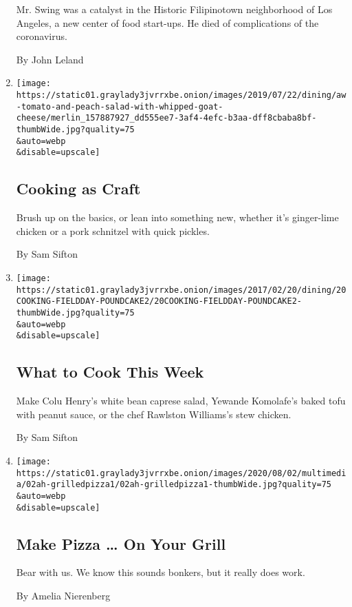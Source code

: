 \begin{enumerate}
  Mr. Swing was a catalyst in the Historic Filipinotown neighborhood of
  Los Angeles, a new center of food start-ups. He died of complications
  of the coronavirus.

  By John Leland
\item
  \href{/2020/08/03/dining/cooking-as-craft.html}{}

  \texttt{[image: https://static01.graylady3jvrrxbe.onion/images/2019/07/22/dining/aw-tomato-and-peach-salad-with-whipped-goat-cheese/merlin\_157887927\_dd555ee7-3af4-4efc-b3aa-dff8cbaba8bf-thumbWide.jpg?quality=75\\\&auto=webp\\\&disable=upscale]}

  \hypertarget{cooking-as-craft}{%
  \subsection{Cooking as Craft}\label{cooking-as-craft}}

  Brush up on the basics, or lean into something new, whether it's
  ginger-lime chicken or a pork schnitzel with quick pickles.

  By Sam Sifton
\item
  \href{/2020/08/02/dining/what-to-cook-this-week.html}{}

  \texttt{[image: https://static01.graylady3jvrrxbe.onion/images/2017/02/20/dining/20COOKING-FIELDDAY-POUNDCAKE2/20COOKING-FIELDDAY-POUNDCAKE2-thumbWide.jpg?quality=75\\\&auto=webp\\\&disable=upscale]}

  \hypertarget{what-to-cook-this-week}{%
  \subsection{What to Cook This Week}\label{what-to-cook-this-week}}

  Make Colu Henry's white bean caprese salad, Yewande Komolafe's baked
  tofu with peanut sauce, or the chef Rawlston Williams's stew chicken.

  By Sam Sifton
\item
  \href{/2020/08/01/at-home/coronavirus-make-pizza-on-a-grill.html}{}

  \texttt{[image: https://static01.graylady3jvrrxbe.onion/images/2020/08/02/multimedia/02ah-grilledpizza1/02ah-grilledpizza1-thumbWide.jpg?quality=75\\\&auto=webp\\\&disable=upscale]}

  \hypertarget{make-pizza--on-your-grill}{%
  \subsection{Make Pizza \ldots{} On Your
  Grill}\label{make-pizza--on-your-grill}}

  Bear with us. We know this sounds bonkers, but it really does work.

  By Amelia Nierenberg
\end{enumerate}

